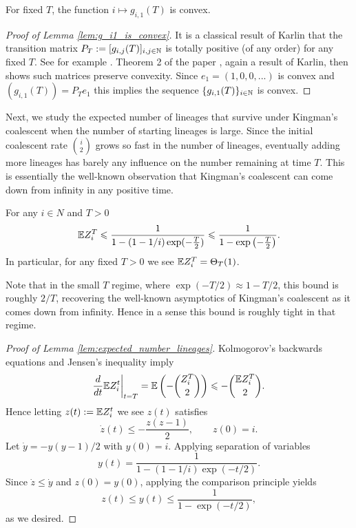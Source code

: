 \begin{subappendices}
    \begin{lemma}
\label{lem:g_i1_is_convex}
        For fixed $T$, the function $i \mapsto g_{i,1}(T)$ is convex.
    \end{lemma}

    \begin{proof}[Proof of Lemma \ref{lem:g_i1_is_convex}]
      It is a classical result of Karlin that the transition matrix $P_T := [g_{i,j}(T)]_{i,j\in \mathbb{N}}$ is totally positive (of any order) for any fixed $T$. See for example \cite{karlin1959_coincidence_probabilities}. Theorem 2 of the paper \cite{eppen1966_convexity_preserving_stochastic_matrices}, again a result of Karlin, then shows such matrices preserve convexity. Since $e_1 = (1,0,0,...)$ is convex and $(g_{i,1}(T)) = P_T e_1$ this implies the sequence $\{g_{i,1}(T)\}_{i \in \mathbb{N}}$ is convex.
    \end{proof}


    \noindent Next, we study the expected number of lineages that survive under Kingman's coalescent when the number of starting lineages is large. Since the initial coalescent rate $\binom{i}{2}$ grows so fast in the number of lineages, eventually adding more lineages has barely any influence on the number remaining at time $T$. This is essentially the well-known observation that Kingman's coalescent can come down from infinity in any positive time.

    \begin{lemma}
\label{lem:expected_number_lineages}
        For any $i \in N$ and $T > 0$
            \[\mathbb{E} Z_i^T \leqslant \frac{1}{1-(1-1/i)\exp(-\frac{T}{2})} \leqslant\frac{1}{1-\exp\left(-\frac{T}{2}\right)}.\]
        In particular, for any fixed $T > 0$ we see $\mathbb{E} Z_i^T = \Theta_T(1)$.
    \end{lemma}

    \noindent Note that in the small $T$ regime, where $\exp(-T/2) \approx 1-T/2$, this bound is roughly $2/T$, recovering the well-known asymptotics of Kingman's coalescent as it comes down from infinity. Hence in a sense this bound is roughly tight in that regime.

    \begin{proof}[Proof of Lemma \ref{lem:expected_number_lineages}]
    Kolmogorov's backwards equations and Jensen's inequality imply
        \[\frac{d}{dt} \mathbb{E} Z_i^t \bigg \vert_{t=T} = \mathbb{E} \left(-\binom{Z_i^T}{2} \right) \leqslant -\binom{\mathbb{E} Z_i^T}{2}.  \]
    \noindent Hence letting $z(t) := \mathbb{E} Z^t_i$ we see $z(t)$ satisfies
        \[\dot{z}(t) \leq -\frac{z(z-1)}{2}, \qquad z(0) = i.\]
    \noindent Let $\dot{y} = - y(y-1)/2$ with $y(0) = i$. Applying separation of variables
    \[y(t) = \frac{1}{1-\left(1-1/i\right) \exp(-t/2)}.\]
    \noindent Since $\dot{z} \leq \dot{y}$ and $z(0) = y(0)$, applying the comparison principle yields
    \[z(t) \leq y(t) \leq \frac{1}{1- \exp(-t/2)},\]
    \noindent as we desired.
    \end{proof}



\end{subappendices}
